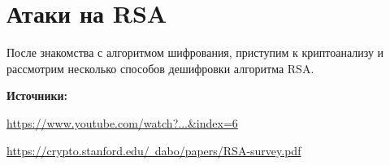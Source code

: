 \documentclass[12pt,a4paper]{scrartcl}
\begin{document}
\section{Атаки на RSA}

После знакомства с алгоритмом шифрования, приступим к криптоанализу и рассмотрим несколько способов дешифровки алгоритма RSA.

\textbf{Источники:}

\href{https://www.youtube.com/watch?v=ibfb7\_-\_CGg\&list=PLLguubeCGWoaGFEDzduGmBhEgZ62p-Jqv\&index=6}{https://www.youtube.com/watch?...\&index=6}

\href{https://crypto.stanford.edu/~dabo/papers/RSA-survey.pdf}{https://crypto.stanford.edu/~dabo/papers/RSA-survey.pdf}
\end{document}
